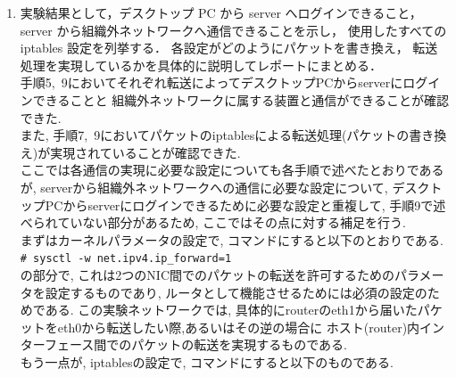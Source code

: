 \begin{enumerate}[label=\arabic*.]
        \quad
        ここでは, pingコマンドによって発生した
        ICMPエコー要求のパケットの例を上げた.
        両パケットでIdentifierとSequesns\, Numberが一致していることから
        同一のパケットであることがわかる.
        eth0において
        server(192.168.100.2)からwindows(10.6.158.153)に送信されて,
        routerに到達したパケットが
        eth1から
        router(10.6.158.90)からwindows(10.6.158.153)へのパケットして,
        送信元のIPアドレスがserverからrouterに書き換えられて転送されていることが確認できる.


        \vspace{\baselineskip}
    
    \item 実験結果として，デスクトップ PC から server へログインできること，
    server から組織外ネットワークへ通信できることを示し，
    使用したすべての iptables 設定を列挙する．
    各設定がどのようにパケットを書き換え，
    転送処理を実現しているかを具体的に説明してレポートにまとめる．\\

        \quad
        手順5,\, 9においてそれぞれ転送によってデスクトップPCからserverにログインできることと
        組織外ネットワークに属する装置と通信ができることが確認できた.\\
        \quad
        また, 手順7,\, 9においてパケットのiptablesによる転送処理(パケットの書き換え)が実現されていることが確認できた.\\
        \quad
        ここでは各通信の実現に必要な設定についても各手順で述べたとおりであるが,
        serverから組織外ネットワークへの通信に必要な設定について,
        デスクトップPCからserverにログインできるために必要な設定と重複して,
        手順9で述べられていない部分があるため,
        ここではその点に対する補足を行う.\\
        \quad
        まずはカーネルパラメータの設定で, 
        コマンドにすると以下のとおりである.\\

        \texttt{\# sysctl -w net.ipv4.ip\_forward=1} \\

        の部分で, 
        これは2つのNIC間でのパケットの転送を許可するためのパラメータを設定するものであり,
        ルータとして機能させるためには必須の設定のためである.
        この実験ネットワークでは, 
        具体的にrouterのeth1から届いたパケットをeth0から転送したい際,あるいはその逆の場合に
        ホスト(router)内インターフェース間でのパケットの転送を実現するものである.
        \\
        \quad
        もう一点が, iptablesの設定で,
        コマンドにすると以下のものである.\\


\end{enumerate}
